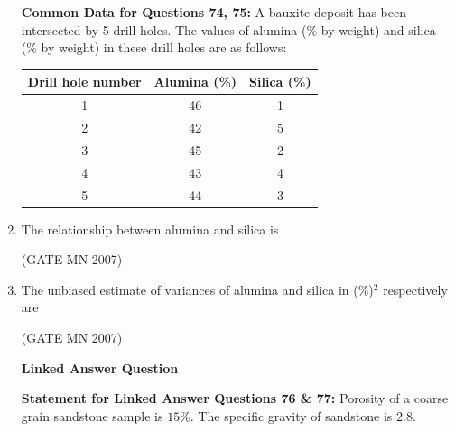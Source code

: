 \documentclass[journal]{IEEEtran}
\begin{document}
\begin{enumerate}
\textbf{Common Data for Questions 74, 75:}  
A bauxite deposit has been intersected by 5 drill holes. The values of alumina (\% by weight) and silica (\% by weight) in these drill holes are as follows:

\begin{center}
\begin{tabular}{|c|c|c|}
\hline
Drill hole number & Alumina (\%) & Silica (\%) \\
\hline
1 & 46 & 1 \\
\hline
2 & 42 & 5 \\
\hline
3 & 45 & 2 \\
\hline
4 & 43 & 4 \\
\hline
5 & 44 & 3 \\
\hline
\end{tabular}
\end{center}

    \item The relationship between alumina and silica is  
    \begin{enumerate}
    \end{enumerate}
    \hfill (GATE MN 2007)

    \item The unbiased estimate of variances of alumina and silica in (\%)$^2$ respectively are  
    \begin{enumerate}
    \end{enumerate}
    \hfill (GATE MN 2007)


\begin{center}
	\textbf{Linked Answer Question}
\end{center}

\textbf{Statement for Linked Answer Questions 76 \& 77:}  
Porosity of a coarse grain sandstone sample is $15\%$. The specific gravity of sandstone is $2.8$.


\end{enumerate}
\end{document}
